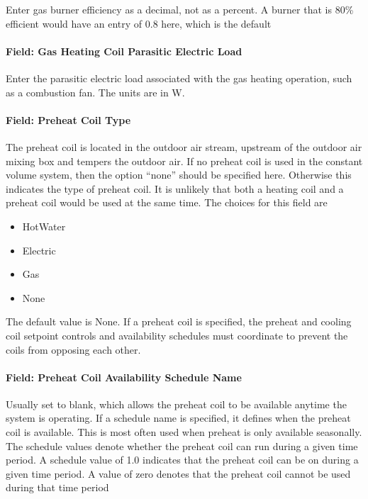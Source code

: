 Enter gas burner efficiency as a decimal, not as a percent. A burner that is 80\% efficient would have an entry of 0.8 here, which is the default

\paragraph{Field: Gas Heating Coil Parasitic Electric Load}\label{field-gas-heating-coil-parasitic-electric-load-6}

Enter the parasitic electric load associated with the gas heating operation, such as a combustion fan. The units are in W.

\paragraph{Field: Preheat Coil Type}\label{field-preheat-coil-type-2}

The preheat coil is located in the outdoor air stream, upstream of the outdoor air mixing box and tempers the outdoor air. If no preheat coil is used in the constant volume system, then the option ``none'' should be specified here. Otherwise this indicates the type of preheat coil. It is unlikely that both a heating coil and a preheat coil would be used at the same time. The choices for this field are

\begin{itemize}
\item
  HotWater
\item
  Electric
\item
  Gas
\item
  None
\end{itemize}

The default value is None. If a preheat coil is specified, the preheat and cooling coil setpoint controls and availability schedules must coordinate to prevent the coils from opposing each other.

\paragraph{Field: Preheat Coil Availability Schedule Name}\label{field-preheat-coil-availability-schedule-name-2}

Usually set to blank, which allows the preheat coil to be available anytime the system is operating. If a schedule name is specified, it defines when the preheat coil is available. This is most often used when preheat is only available seasonally. The schedule values denote whether the preheat coil can run during a given time period. A schedule value of 1.0 indicates that the preheat coil can be on during a given time period. A value of zero denotes that the preheat coil cannot be used during that time period

